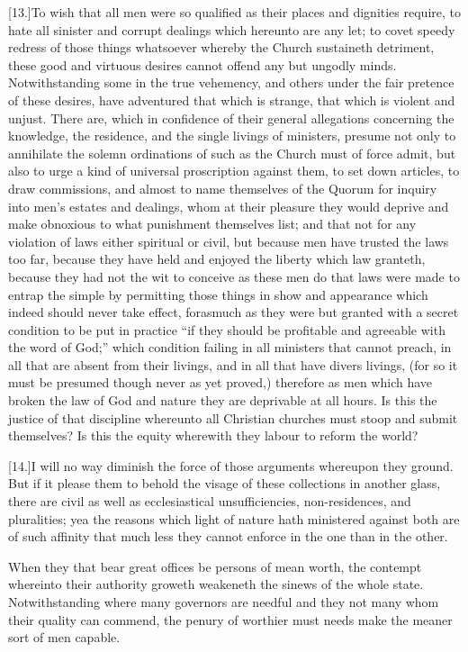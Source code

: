 [13.]To wish that all men were so qualified as their places and dignities require, to hate all sinister and corrupt dealings which hereunto are any let; to covet speedy redress of those things whatsoever whereby the Church sustaineth detriment, these good and virtuous desires cannot offend any but ungodly  minds.
 Notwithstanding some in the true vehemency, and others under the fair pretence of these desires, have adventured that which is strange, that which is violent and unjust. There are, which in confidence of their general allegations concerning the knowledge, the residence, and the single livings of ministers, presume not only to annihilate the solemn ordinations of such as the Church must of force admit, but also to urge a kind of universal proscription against them, to set down articles, to draw commissions, and almost to name themselves of the Quorum for inquiry into men’s estates and dealings, whom at their pleasure they would deprive and make obnoxious to what punishment themselves list; and that not for any violation of laws either spiritual or civil, but because men have trusted the laws too far, because they have held and enjoyed the liberty which law granteth, because they had not the wit to conceive as these men do that laws were made to entrap the simple by permitting those things in show and appearance which indeed should never take effect, forasmuch as they were but granted with a secret condition to be put in practice “if they should be profitable and agreeable with the word of God;” which condition failing in all ministers that cannot preach, in all that are absent from their livings, and in all that have divers livings, (for so it must be presumed though never as yet proved,) therefore as men which have broken the law of God and nature they are deprivable at all hours. Is this the justice of that discipline whereunto all Christian churches must stoop and submit themselves? Is this the equity wherewith they labour to reform the world?

[14.]I will no way diminish the force of those arguments whereupon they ground. But if it please them to behold the visage of these collections in another glass, there are civil as well as ecclesiastical unsufficiencies, non-residences, and pluralities; yea the reasons which light of nature hath ministered against both are of such affinity that much less they cannot enforce in the one than in the other.

When they that bear great offices be persons of mean worth, the contempt whereinto their authority groweth  weakeneth the sinews of the whole state.
 Notwithstanding where many governors are needful and they not many whom their quality can commend, the penury of worthier must needs make the meaner sort of men capable.

